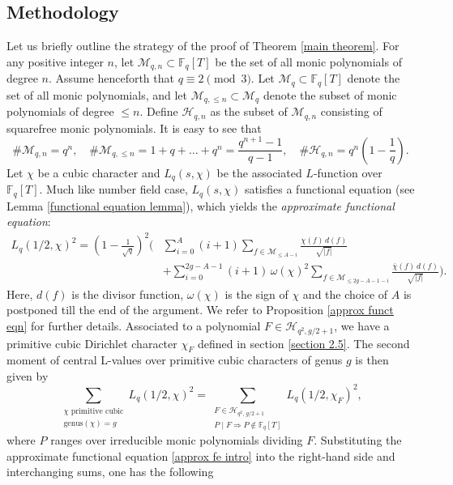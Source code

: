 \documentclass[table]{amsart}
\newcommand{\F}{\mathbb{F}}
\newcommand{\cM}{\mathcal{M}}
\numberwithin{equation}{section}
\begin{document}
\subsection{Methodology}
Let us briefly outline the strategy of the proof of Theorem \ref{main theorem}. For any positive integer \( n \), let \( \mathcal{M}_{q,n} \subset \F_q[T] \) be the set of all monic polynomials of degree \( n \). Assume henceforth that $q\equiv 2\pmod{3}$. Let \( \mathcal{M}_q \subset \F_q[T] \) denote the set of all monic polynomials, and let \( \mathcal{M}_{q,\leq n} \subset \mathcal{M}_q \) denote the subset of monic polynomials of degree \( \leq n \). Define \( \mathcal{H}_{q,n} \) as the subset of \( \mathcal{M}_{q,n} \) consisting of squarefree monic polynomials. It is easy to see that
    \[
    \# \mathcal{M}_{q,n} = q^n, \quad \# \mathcal{M}_{q,\leq n} = 1 + q + \dots + q^n = \frac{q^{n+1} - 1}{q - 1}, \quad \# \mathcal{H}_{q,n} = q^n \left(1 - \frac{1}{q} \right).
    \] Let $\chi$ be a cubic character and $L_q(s, \chi)$ be the associated $L$-function over $\F_q[T]$. Much like number field case, \( L_q(s, \chi) \) satisfies a functional equation (see Lemma \ref{functional equation lemma}), which yields the \emph{approximate functional equation}:
\begin{equation}\label{approx fe intro}
\begin{split}
L_q(1/2, \chi)^2 = \left(1 - \frac{1}{\sqrt{q}}\right)^2 \Bigg( & \sum_{i=0}^A (i+1) \sum_{f \in \cM_{\leq A - i}} \frac{\chi(f)\, d(f)}{\sqrt{|f|}} \\
& + \sum_{i=0}^{2g - A - 1} (i+1)\, \omega(\chi)^2 \sum_{f \in \cM_{\leq 2g - A - 1 - i}} \frac{\bar{\chi}(f)\, d(f)}{\sqrt{|f|}} \Bigg).
\end{split}
\end{equation}
Here, $d(f)$ is the divisor function, $\omega(\chi)$ is the sign of $\chi$ and the choice of $A$ is postponed till the end of the argument. We refer to Proposition \ref{approx funct eqn} for further details. Associated to a polynomial $F \in \mathcal{H}_{q^2, g/2 + 1}$, we have a primitive cubic Dirichlet character $\chi_F$ defined in section \ref{section 2.5}.
The second moment of central L-values over primitive cubic characters of genus \( g \) is then given by
\[
\sum_{\substack{\chi \text{ primitive cubic} \\ \mathrm{genus}(\chi) = g}} L_q(1/2, \chi)^2 = \sum_{\substack{F \in \mathcal{H}_{q^2,\, g/2 + 1} \\ P \mid F \Rightarrow P \notin \mathbb{F}_q[T]}} L_q(1/2, \chi_F)^2,
\]
where $P$ ranges over irreducible monic polynomials dividing $F$. Substituting the approximate functional equation \eqref{approx fe intro} into the right-hand side and interchanging sums, one has the following
\end{document}
